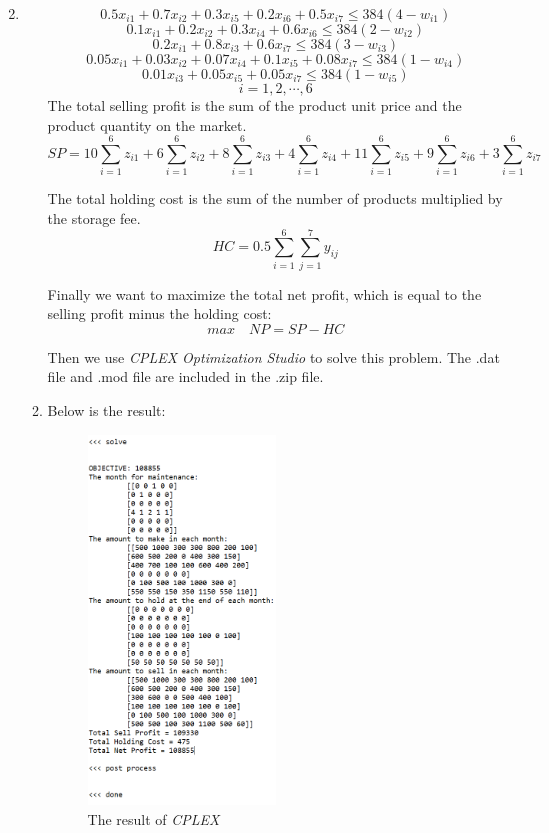 \documentclass[12pt,a4paper]{article}
\makeatletter
\newtheorem*{solution}{Solution}
\theoremstyle{definition}
\renewenvironment{solution}[1][Solution] {\par\pushQED{\qed}\normalfont\topsep6\p@\@plus6\p@\relax\trivlist\item[\hskip\labelsep\bfseries#1\@addpunct{.}]\ignorespaces}{\popQED\endtrivlist\@endpefalse} \makeatother
\makeatother
\begin{document}
\begin{enumerate}
\begin{solution}
\begin{enumerate}
$$0.5 x_{i1} + 0.7 x_{i2} + 0.3 x_{i5} + 0.2 x_{i6} + 0.5 x_{i7} \leqslant 384(4 - w_{i1})$$
$$0.1 x_{i1} + 0.2 x_{i2} + 0.3 x_{i4} + 0.6 x_{i6} \leqslant 384(2 - w_{i2})$$
$$0.2 x_{i1} + 0.8 x_{i3} + 0.6 x_{i7} \leqslant 384(3 - w_{i3})$$
$$0.05 x_{i1} + 0.03 x_{i2} + 0.07 x_{i4} + 0.1 x_{i5} + 0.08 x_{i7} \leqslant 384(1 - w_{i4})$$
$$0.01 x_{i3} + 0.05 x_{i5}  + 0.05 x_{i7} \leqslant 384(1 - w_{i5})$$
$$i = 1,2,\cdots,6$$
The total selling profit is the sum of the product unit price and the product quantity on the market.
$$ SP = 10 \sum_{i=1}^6{z_{i1}} + 6 \sum_{i=1}^6{z_{i2}} + 8\sum_{i=1}^6{z_{i3}} + 4\sum_{i=1}^6{z_{i4}} + 11\sum_{i=1}^6{z_{i5}} + 9\sum_{i=1}^6{z_{i6}} + 3\sum_{i=1}^6{z_{i7}}$$

The total holding cost is the sum of the number of products multiplied by the storage fee.
$$HC = 0.5 \sum_{i=1}^6 \sum_{j=1}^7 y_{ij}$$

Finally we want to maximize the total net profit, which is equal to the selling profit minus the holding cost:
$$max \quad NP = SP-HC$$

Then we use \textit{CPLEX Optimization Studio} to solve this problem. 
The .dat file and .mod file are included in the .zip file.

\item
Below is the result:
\begin{figure}[H]
    \centering
    \includegraphics[width=0.5\textwidth]{profit.png}
    \caption{The result of \textit{CPLEX}}
\end{figure}


\end{enumerate}
\end{solution}
\end{enumerate}
\end{document}
